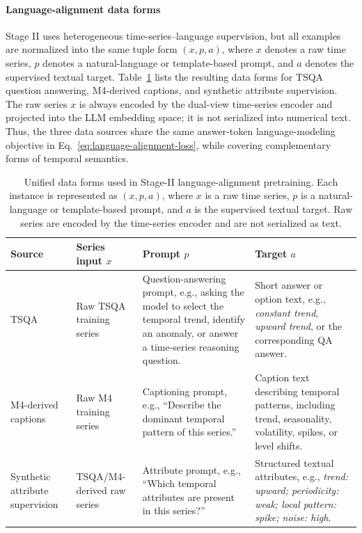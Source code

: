 \documentclass[10pt,journal,compsoc]{IEEEtran}
\begin{document}
\paragraph{Language-alignment data forms}
Stage II uses heterogeneous time-series--language supervision, but all examples are normalized into the same tuple form $(x,p,a)$, where $x$ denotes a raw time series, $p$ denotes a natural-language or template-based prompt, and $a$ denotes the supervised textual target.
Table~\ref{tab:pretrain-data-forms} lists the resulting data forms for TSQA question answering, M4-derived captions, and synthetic attribute supervision.
The raw series $x$ is always encoded by the dual-view time-series encoder and projected into the LLM embedding space; it is not serialized into numerical text.
Thus, the three data sources share the same answer-token language-modeling objective in Eq.~\eqref{eq:language-alignment-loss}, while covering complementary forms of temporal semantics.

\begin{table}[t]
\centering
\caption{Unified data forms used in Stage-II language-alignment pretraining. Each instance is represented as $(x,p,a)$, where $x$ is a raw time series, $p$ is a natural-language or template-based prompt, and $a$ is the supervised textual target. Raw series are encoded by the time-series encoder and are not serialized as text.}
\label{tab:pretrain-data-forms}
\scriptsize
\setlength{\tabcolsep}{2.5pt}
\renewcommand{\arraystretch}{1.08}
\begin{tabular}{@{}p{}p{}p{}p{}@{}}
\toprule
\textbf{Source} & \textbf{Series input $x$} & \textbf{Prompt $p$} & \textbf{Target $a$} \\
\midrule
TSQA & Raw TSQA training series &
Question-answering prompt, e.g., asking the model to select the temporal trend, identify an anomaly, or answer a time-series reasoning question. &
Short answer or option text, e.g., \emph{constant trend}, \emph{upward trend}, or the corresponding QA answer. \\
\midrule
M4-derived captions & Raw M4 training series &
Captioning prompt, e.g., ``Describe the dominant temporal pattern of this series.'' &
Caption text describing temporal patterns, including trend, seasonality, volatility, spikes, or level shifts. \\
\midrule
Synthetic attribute supervision & TSQA/M4-derived raw series &
Attribute prompt, e.g., ``Which temporal attributes are present in this series?'' &
Structured textual attributes, e.g., \emph{trend: upward; periodicity: weak; local pattern: spike; noise: high}. \\
\bottomrule
\end{tabular}
\end{table}
\end{document}
